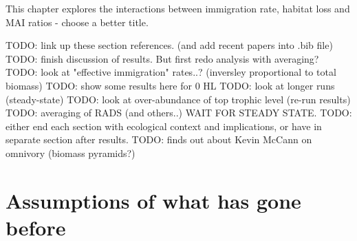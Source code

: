 This chapter explores the interactions between immigration rate, habitat loss and MAI ratios - choose a better title.

TODO: link up these section references. (and add recent papers into .bib file) \\
TODO: finish discussion of results. But first redo analysis with averaging? 
TODO: look at "effective immigration" rates..? (inversley proportional to total biomass)
TODO: show some results here for 0 HL
TODO: look at longer runs (steady-state)
TODO: look at over-abundance of top trophic level (re-run results)
TODO: averaging of RADS (and others..) WAIT FOR STEADY STATE.
TODO: either end each section with ecological context and implications, or have in separate section after results.
TODO: finds out about Kevin McCann on omnivory (biomass pyramids?)

\section{Assumptions of what has gone before}


